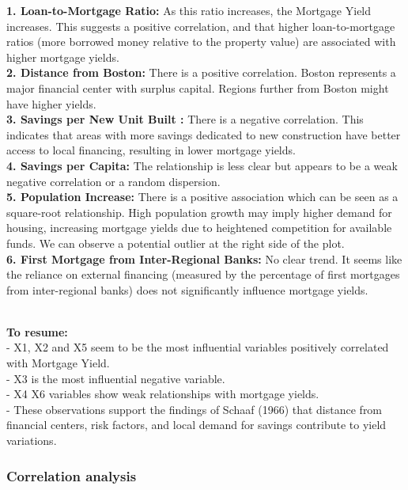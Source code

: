 \documentclass[
  11pt,
]{article}
\begin{document}
\textbf{1. Loan-to-Mortgage Ratio:} As this ratio increases, the
Mortgage Yield increases. This suggests a positive correlation, and that
higher loan-to-mortgage ratios (more borrowed money relative to the
property value) are associated with higher mortgage yields.\\
\textbf{2. Distance from Boston:} There is a positive correlation.
Boston represents a major financial center with surplus capital. Regions
further from Boston might have higher yields.\\
\textbf{3. Savings per New Unit Built :} There is a negative
correlation. This indicates that areas with more savings dedicated to
new construction have better access to local financing, resulting in
lower mortgage yields.\\
\textbf{4. Savings per Capita:} The relationship is less clear but
appears to be a weak negative correlation or a random dispersion.\\
\textbf{5. Population Increase:} There is a positive association which
can be seen as a square-root relationship. High population growth may
imply higher demand for housing, increasing mortgage yields due to
heightened competition for available funds. We can observe a potential
outlier at the right side of the plot.\\
\textbf{6. First Mortgage from Inter-Regional Banks:} No clear trend. It
seems like the reliance on external financing (measured by the
percentage of first mortgages from inter-regional banks) does not
significantly influence mortgage yields.\\
\strut \\
\textbf{To resume:}\\
- X1, X2 and X5 seem to be the most influential variables positively
correlated with Mortgage Yield.\\
- X3 is the most influential negative variable.\\
- X4 X6 variables show weak relationships with mortgage yields.\\
- These observations support the findings of Schaaf (1966) that distance
from financial centers, risk factors, and local demand for savings
contribute to yield variations.\\

\subsubsection{Correlation analysis}\label{correlation-analysis}
\end{document}
